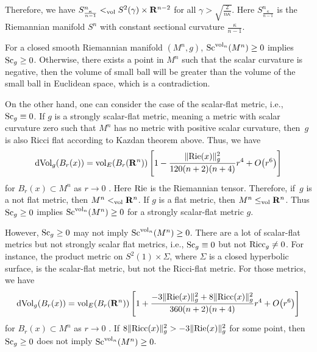 \documentclass[pdftex]{sigma}
\begin{document}
Therefore, we have $S^n_{\frac{\kappa}{n-1}}<_{\rm vol} S^2(\gamma)\times \mathbf{R}^{n-2}$ for all $\gamma>\sqrt{\frac{2}{n\kappa}}$. Here $S^n_{\frac{\kappa}{n-1}}$ is the Riemannian manifold $S^n$ with constant sectional curvature $\frac{\kappa}{n-1}$.

\begin{Remark}For a closed smooth Riemannian manifold $(M^n,g)$, ${\rm Sc}^{{\rm vol}_n}(M^n)\geq 0 $ implies ${\rm Sc}_g\geq 0$. Otherwise, there exists a point in $M^n$ such that the scalar curvature is negative, then the volume of small ball will be greater than the volume of the small ball in Euclidean space, which is a contradiction.

On the other hand, one can consider the case of the scalar-flat metric, i.e., ${\rm Sc}_g\equiv 0$. If $g$ is a strongly scalar-flat metric, meaning a metric with scalar curvature zero such that $M^n$ has no metric with positive scalar curvature, then~$g$ is also Ricci flat according to Kazdan theorem above. Thus, we have
 \begin{gather*}
 {\rm dVol}_g(B_r(x)) = {\rm vol}_E(B_r(\mathbf{R}^n))\left[1 - \frac{\|{\rm Rie}(x)\|^2_g}{120(n+2)(n+4)} r^4 + O\big(r^6\big)\right]
 \end{gather*}
 for $B_r(x) \subset M^n$ as $r\to 0$ {\rm \cite[Theorem~3.3]{MR521460}}. Here ${\rm Rie}$ is the Riemannian tensor. Therefore, if~$g$ is a not flat metric, then $M^n<_{\rm vol} \mathbf{R}^n$. If $g$ is a flat metric, then $M^n\leq_{\rm vol} \mathbf{R}^n$. Thus ${\rm Sc}_g\geq 0$ implies ${\rm Sc}^{{\rm vol}_n}(M^n)\geq 0 $ for a strongly scalar-flat metric $g$.

 However, ${\rm Sc}_g\geq 0$ may not imply ${\rm Sc}^{{\rm vol}_n}(M^n)\geq 0$. There are a lot of scalar-flat metrics but not strongly scalar flat metrics, i.e., ${\rm Sc}_g\equiv 0$ but not ${\rm Ricc}_g\neq 0$. For instance, the product metric on $S^2(1)\times \Sigma$, where $\Sigma$ is a closed hyperbolic surface, is the scalar-flat metric, but not the Ricci-flat metric. For those metrics, we have
 \begin{gather*}
 {\rm dVol}_g(B_r(x)) = {\rm vol}_E(B_r(\mathbf{R}^n))\left[1 + \frac{-3\|{\rm Rie}(x)\|^2_g+8\|{\rm Ricc}(x)\|^2_g}{360(n+2)(n+4)} r^4 + O\big(r^6\big)\right]
 \end{gather*}
 for $B_r(x) \subset M^n$ as $r\to 0$ {\rm \cite[Theorem~3.3]{MR521460}}. If $8\|{\rm Ricc}(x)\|^2_g>-3\|{\rm Rie}(x)\|^2_g$ for some point, then ${\rm Sc}_g\geq 0$ does not imply ${\rm Sc}^{{\rm vol}_n}(M^n)\geq 0$.
\end{Remark}
\end{document}
